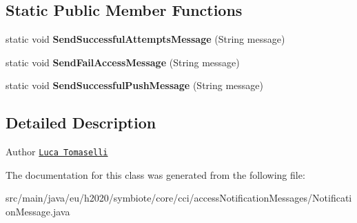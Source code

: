 \subsection*{Static Public Member Functions}
\begin{DoxyCompactItemize}
\item 
\mbox{\label{classeu_1_1h2020_1_1symbiote_1_1core_1_1cci_1_1accessNotificationMessages_1_1NotificationMessage_ac04267e6a5d23b1d491d1bde9b2ea0ca}} 
static void {\bfseries Send\+Successful\+Attempts\+Message} (String message)
\item 
\mbox{\label{classeu_1_1h2020_1_1symbiote_1_1core_1_1cci_1_1accessNotificationMessages_1_1NotificationMessage_a1744d0ca8a4b7704cbe335102c28e85a}} 
static void {\bfseries Send\+Fail\+Access\+Message} (String message)
\item 
\mbox{\label{classeu_1_1h2020_1_1symbiote_1_1core_1_1cci_1_1accessNotificationMessages_1_1NotificationMessage_af52f90e256d229542df3ba9421b7c582}} 
static void {\bfseries Send\+Successful\+Push\+Message} (String message)
\end{DoxyCompactItemize}


\subsection{Detailed Description}
\begin{DoxyAuthor}{Author}
\href{mailto:l.tomaselli@nextworks.it}{\tt Luca Tomaselli} 
\end{DoxyAuthor}


The documentation for this class was generated from the following file\+:\begin{DoxyCompactItemize}
\item 
src/main/java/eu/h2020/symbiote/core/cci/access\+Notification\+Messages/Notification\+Message.\+java\end{DoxyCompactItemize}
